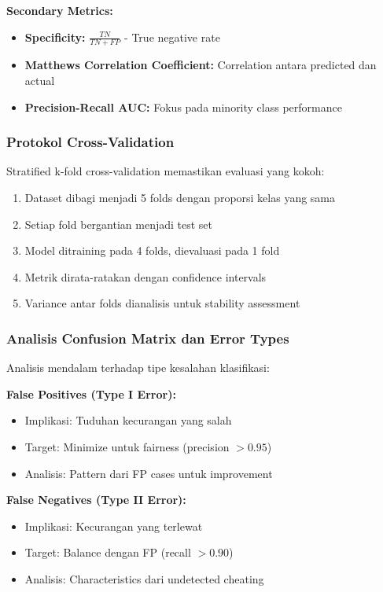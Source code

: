 \textbf{Secondary Metrics:}
\begin{itemize}
    \item \textbf{Specificity:} $\frac{TN}{TN + FP}$ - True negative rate
    \item \textbf{Matthews Correlation Coefficient:} Correlation antara predicted dan actual
    \item \textbf{Precision-Recall AUC:} Fokus pada minority class performance
\end{itemize}

\subsubsection{Protokol Cross-Validation}
\label{sec:protokolCV}

Stratified k-fold cross-validation memastikan evaluasi yang kokoh:

\begin{enumerate}
    \item Dataset dibagi menjadi 5 folds dengan proporsi kelas yang sama
    \item Setiap fold bergantian menjadi test set
    \item Model ditraining pada 4 folds, dievaluasi pada 1 fold
    \item Metrik dirata-ratakan dengan confidence intervals
    \item Variance antar folds dianalisis untuk stability assessment
\end{enumerate}

\subsubsection{Analisis Confusion Matrix dan Error Types}
\label{sec:confusionMatrixAnalysis}

Analisis mendalam terhadap tipe kesalahan klasifikasi:

\textbf{False Positives (Type I Error):}
\begin{itemize}
    \item Implikasi: Tuduhan kecurangan yang salah
    \item Target: Minimize untuk fairness (precision $> 0.95$)
    \item Analisis: Pattern dari FP cases untuk improvement
\end{itemize}

\textbf{False Negatives (Type II Error):}
\begin{itemize}
    \item Implikasi: Kecurangan yang terlewat
    \item Target: Balance dengan FP (recall $> 0.90$)
    \item Analisis: Characteristics dari undetected cheating
\end{itemize}

